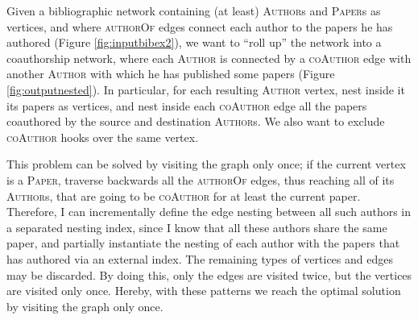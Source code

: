 \begin{example}
	\label{ex:nestingbib}
	Given a bibliographic network containing (at least) \textsc{Author}s and \textsc{Paper}s as vertices, and where \textsc{authorOf} edges connect each author to the papers he has authored (Figure \ref{fig:inputbibex2}), we want to ``roll up'' the network into a coauthorship network, where each \textsc{Author} is connected by a \textsc{coAuthor} edge with another  \textsc{Author} with which he has published some papers (Figure \ref{fig:outputnested}). In particular, for each resulting \textsc{Author} vertex, nest inside it  its papers as vertices, and nest inside each \textsc{coAuthor} edge all the papers coauthored by  the source and destination \textsc{Author}s. We also want to exclude \textsc{coAuthor} hooks over the same vertex.
	
	This problem can be solved by visiting the graph only once; %
	if the current vertex is a \textsc{Paper}, traverse backwards all the \textsc{authorOf} edges, thus reaching all of its \textsc{Author}s, that are going to be \textsc{coAuthor} for at least the current paper. Therefore, I can incrementally define the edge nesting between all such authors in a separated nesting index, since I know that all these authors share the same paper, and partially instantiate the nesting of each author with the papers that has authored via an external index. The remaining types of vertices and edges %
	may be discarded. %
	By doing this, only the edges are visited twice, but the vertices are visited only once. Hereby, with these patterns we reach the optimal solution by visiting the graph only once.
	

\end{example}
